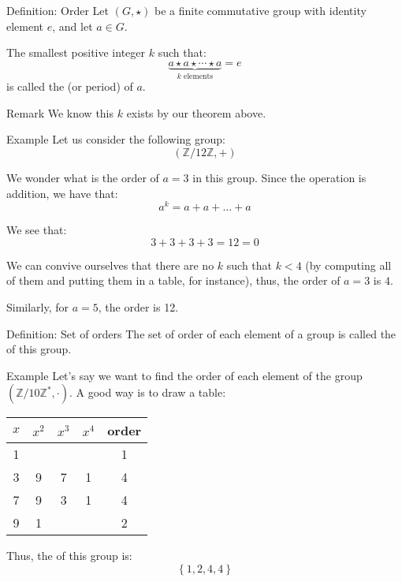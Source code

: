 \documentclass[a4paper]{article}
\begin{document}
\begin{parag}{Definition: Order}
    Let $\left(G, \star\right)$ be a finite commutative group with identity element $e$, and let $a \in G$.

    The smallest positive integer $k$ such that:
    \[\underbrace{a \star a \star \cdots \star a}_{\text{$k$ elements}} = e\]
    is called the  (or period) of $a$.

    \begin{subparag}{Remark}
        We know this $k$ exists by our theorem above.
    \end{subparag}
\end{parag}

\begin{parag}{Example}
    Let us consider the following group:
    \[\left(\mathbb{Z} / 12\mathbb{Z}, +\right)\]

    We wonder what is the order of $a = 3$ in this group. Since the operation is addition, we have that:
    \[a^k = a + a + \ldots + a\]

    We see that:
    \[3 + 3 + 3 + 3 = 12 = 0\]

    We can convive ourselves that there are no $k$ such that $k < 4$ (by computing all of them and putting them in a table, for instance), thus, the order of $a = 3$ is $4$.

    Similarly, for $a = 5$, the order is 12.
\end{parag}

\begin{parag}{Definition: Set of orders}
    The set of order of each element of a group is called the  of this group.
\end{parag}

\begin{parag}{Example}
    Let's say we want to find the order of each element of the group $\left(\mathbb{Z} / 10\mathbb{Z}^*, \cdot\right)$. A good way is to draw a table:

    \begin{center}
    \begin{tabular}{cccc|c}
        $x$ & $x^2$ & $x^3$ & $x^4$ & order \\
        \hline
        1 &    &    &    & 1 \\
        3 & 9  & 7  & 1  & 4 \\
        7 & 9  & 3  & 1  & 4 \\
        9 & 1  &    &    & 2
    \end{tabular}
    \end{center}
        
    Thus, the  of this group is: 
    \[\left\{1, 2, 4, 4\right\}\]
\end{parag}
\end{document}
